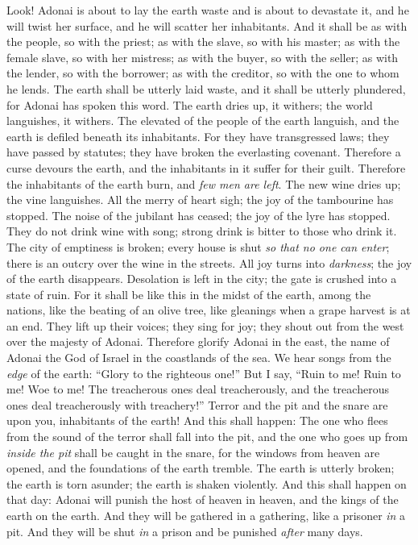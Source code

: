 \begin{biblechapter} %
 Look! Adonai is about to lay the earth waste 
and is about to devastate it, 
and he will twist her surface, 
and he will scatter her inhabitants.
\verse And it shall be as with the people, so with the priest; 
as with the slave, so with his master; 
as with the female slave, so with her mistress; 
as with the buyer, so with the seller; 
as with the lender, so with the borrower; 
as with the creditor, so with the one to whom he lends.
\verse The earth shall be utterly laid waste, 
and it shall be utterly plundered, for Adonai has spoken this word.
\verse The earth dries up, it withers; 
the world languishes, it withers. 
The elevated of the people of the earth languish,
\verse and the earth is defiled beneath its inhabitants. 
For they have transgressed laws; 
they have passed by statutes; 
they have broken the everlasting covenant.
\verse Therefore a curse devours the earth, 
and the inhabitants in it suffer for their guilt. 
Therefore the inhabitants of the earth burn, 
and \textit{few men are left}.
\verse The new wine dries up; 
the vine languishes. 
All the merry of heart sigh;
\verse the joy of the tambourine has stopped. 
The noise of the jubilant has ceased; 
the joy of the lyre has stopped.
\verse They do not drink wine with song; 
strong drink is bitter to those who drink it.
\verse The city of emptiness is broken; 
every house is shut \textit{so that no one can enter};
\verse there is an outcry over the wine in the streets. 
All joy turns into \textit{darkness}; 
the joy of the earth disappears.
\verse Desolation is left in the city; 
the gate is crushed into a state of ruin.
\verse For it shall be like this in the midst of the earth, 
among the nations, 
like the beating of an olive tree, 
like gleanings when a grape harvest is at an end.
\verse They lift up their voices; they sing for joy; 
they shout out from the west over the majesty of Adonai.
\verse Therefore glorify Adonai in the east, 
the name of Adonai the God of Israel in the coastlands of the sea.
\verse We hear songs from the \textit{edge} of the earth: 
“Glory to the righteous one!” 
But I say, “Ruin to me! 
Ruin to me! Woe to me! 
The treacherous ones deal treacherously, 
and the treacherous ones deal treacherously with treachery!”
\verse Terror and the pit and the snare are upon you, inhabitants of the earth!
\verse And this shall happen:
\verse The one who flees from the sound of the terror shall fall into the pit, 
and the one who goes up from \textit{inside the pit} shall be caught in the snare, 
for the windows from heaven are opened, 
and the foundations of the earth tremble.
\verse The earth is utterly broken; 
the earth is torn asunder; 
the earth is shaken violently.
\verse And this shall happen on that day:
\verse Adonai will punish the host of heaven in heaven, 
and the kings of the earth on the earth.
\verse And they will be gathered in a gathering, like a prisoner \textit{in} a pit. 
And they will be shut \textit{in} a prison and be punished \textit{after} many days.
\end{biblechapter}

